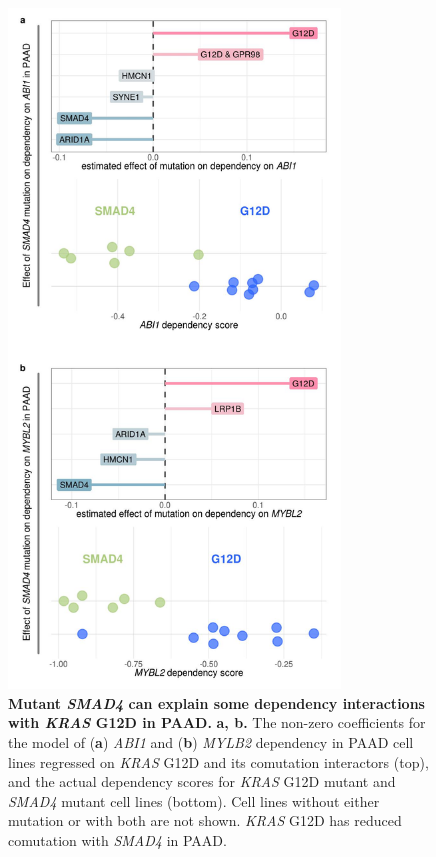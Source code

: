 \documentclass[english, 10pt, letterpaper]{article}
\newcommand{\KRAS}{\emph{KRAS}}
\begin{document}
\begin{figure}[h!]
\centering
\includegraphics[width=88mm]{figures/Supp_Fig_8.jpeg}
\caption{
    \textbf{Mutant \emph{SMAD4} can explain some dependency interactions with \KRAS{} G12D in PAAD.}
    \textbf{a, b.} The non-zero coefficients for the model of (\textbf{a}) \emph{ABI1} and (\textbf{b}) \emph{MYLB2} dependency in PAAD cell lines regressed on \KRAS{} G12D and its comutation interactors (top), and the actual dependency scores for \KRAS{} G12D mutant and \emph{SMAD4} mutant cell lines (bottom). Cell lines without either mutation or with both are not shown. \KRAS{} G12D has reduced comutation with \emph{SMAD4} in PAAD.
}
\label{sfig:dep-map-comut-masking}
\end{figure}
\newpage


\end{document}
